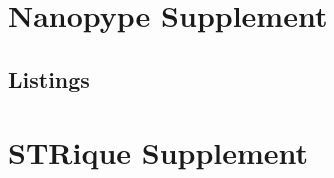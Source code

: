 \chapter{Nanopype Supplement}
\label{cha:supplement:nanopype}

\section{Listings}
\label{sec:supplement:nanopype:listings}


%

%




\label{sec:supplement:nanopype:report}



\chapter{STRique Supplement}




